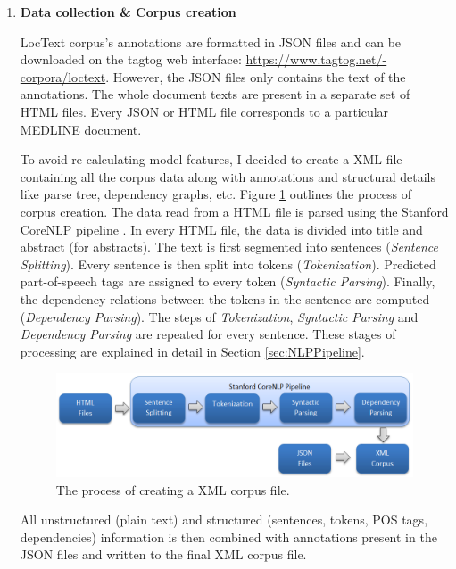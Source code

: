 \begin{enumerate}

\item \textbf{Data collection \& Corpus creation}

LocText corpus's annotations are formatted in JSON files and can be downloaded on the tagtog web interface: \url{https://www.tagtog.net/-corpora/loctext}. However, the JSON files only contains the text of the annotations. The whole document texts are present in a separate set of HTML files. Every JSON or HTML file corresponds to a particular MEDLINE \cite{medline} document.

To avoid re-calculating model features, I decided to create a XML file containing all the corpus data along with annotations and structural details like parse tree, dependency graphs, etc. Figure \ref{fig:corpusCreation} outlines the process  of corpus creation. The data read from a HTML file is parsed using the Stanford CoreNLP pipeline \cite{manning2014stanford}. In every HTML file, the data is divided into title and abstract (for abstracts). The text is first segmented into sentences (\textit{Sentence Splitting}). Every sentence is then split into tokens (\textit{Tokenization}). Predicted part-of-speech tags are assigned to every token (\textit{Syntactic Parsing}). Finally, the dependency relations between the tokens in the sentence are computed (\textit{Dependency Parsing}). The steps of \textit{Tokenization}, \textit{Syntactic Parsing} and \textit{Dependency Parsing} are repeated for every sentence. These stages of processing are explained in detail in Section \ref{sec:NLPPipeline}.

\begin{figure}
\centering
\includegraphics[scale=0.58]{figures/Corpus_Creation.png}
\caption{The process of creating a XML corpus file.}\label{fig:corpusCreation}
\end{figure}

All unstructured (plain text) and structured (sentences, tokens, POS tags, dependencies) information is then combined with annotations present in the JSON files and written to the final XML corpus file.


\end{enumerate}
